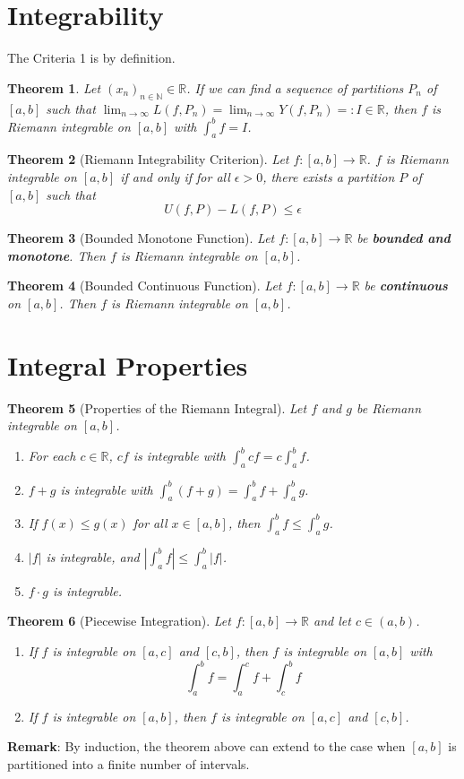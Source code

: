 \documentclass[12pt]{article}
\newtheorem{theorem}{Theorem}[section]
\theoremstyle{definition}
\begin{document}
\section{Integrability}
The Criteria 1 is by definition.
\begin{theorem}
\normalfont Let $(x_n)_{n\in\mathbb{N}}\in \mathbb{R}$. If we can find a sequence of partitions $P_n$ of $[a,b]$ such that $\lim_{n\to\infty}L(f,P_n)=\lim_{n\to\infty}Y(f,P_n)=:I\in\mathbb{R}$, then $f$ is Riemann integrable on $[a,b]$ with $\int_a^b f=I$.
\end{theorem}
\begin{theorem}[Riemann Integrability Criterion]
\normalfont Let $f:[a,b]\to\mathbb{R}$. $f$ is Riemann integrable on $[a,b]$ \textit{if and only if} for all $\epsilon>0$, there exists a partition $P$ of $[a,b]$ such that
\[
U(f,P)-L(f,P)\leq \epsilon
\]
\end{theorem}
\begin{theorem}[Bounded Monotone Function]
\normalfont Let $f:[a,b]\to\mathbb{R}$ be \textbf{bounded and monotone}. Then $f$ is Riemann integrable on $[a,b]$.
\end{theorem}
\begin{theorem}[Bounded Continuous Function]
\normalfont Let $f:[a,b]\to\mathbb{R}$ be \textbf{continuous} on $[a,b]$. Then $f$ is Riemann integrable on $[a,b]$.
\end{theorem}
\section{Integral Properties}
\begin{theorem}[Properties of the Riemann Integral]
\normalfont Let $f$ and $g$ be Riemann integrable on $[a,b]$.
\begin{enumerate}
	\item For each $c\in\mathbb{R}$, $cf$ is integrable with $\int_a^b cf=c\int_a^bf$.
	\item $f+g$ is integrable with $\int_a^b(f+g)=\int_a^bf+\int_a^bg$.
	\item If $f(x)\leq g(x)$ for all $x\in[a,b]$, then $\int_a^bf\leq \int_a^bg$.
	\item $|f|$ is integrable, and $|\int_a^bf|\leq \int_a^b|f|$.
	\item $f\cdot g$ is integrable.
\end{enumerate}
\end{theorem}
\begin{theorem}[Piecewise Integration]
\normalfont Let $f:[a,b]\to\mathbb{R}$ and let $c\in(a,b)$.
\begin{enumerate}
	\item If $f$ is integrable on $[a,c]$ and $[c,b]$, then $f$ is integrable on $[a,b]$ with
	\[
\int_a^b f=\int_a^c f +\int_c^b f
	\]
	\item If $f$ is integrable on $[a,b]$, then $f$ is integrable on $[a,c]$ and $[c,b]$.
\end{enumerate}
\end{theorem}
\textbf{Remark}: By induction, the theorem above can extend to the case when $[a,b]$ is partitioned into a finite number of intervals.
\end{document}
